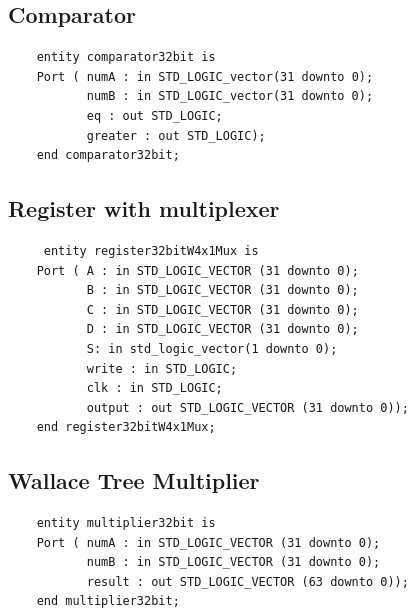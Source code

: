 \documentclass[a4paper,10pt]{article}
\begin{document}
    \subsection{Comparator}
    \begin{lstlisting}
    entity comparator32bit is
    Port ( numA : in STD_LOGIC_vector(31 downto 0);
           numB : in STD_LOGIC_vector(31 downto 0);
           eq : out STD_LOGIC;
           greater : out STD_LOGIC);
    end comparator32bit;
    \end{lstlisting}

    \subsection{Register with multiplexer}
    \begin{lstlisting}
     entity register32bitW4x1Mux is
    Port ( A : in STD_LOGIC_VECTOR (31 downto 0);
           B : in STD_LOGIC_VECTOR (31 downto 0);
           C : in STD_LOGIC_VECTOR (31 downto 0);
           D : in STD_LOGIC_VECTOR (31 downto 0);
           S: in std_logic_vector(1 downto 0);
           write : in STD_LOGIC;
           clk : in STD_LOGIC;
           output : out STD_LOGIC_VECTOR (31 downto 0));
    end register32bitW4x1Mux;
    \end{lstlisting}

    \subsection{Wallace Tree Multiplier}
    \begin{lstlisting}
    entity multiplier32bit is
    Port ( numA : in STD_LOGIC_VECTOR (31 downto 0);
           numB : in STD_LOGIC_VECTOR (31 downto 0);
           result : out STD_LOGIC_VECTOR (63 downto 0));
    end multiplier32bit;
    \end{lstlisting}

    \newpage
    \label{sec:controlUnit}
\end{document}
